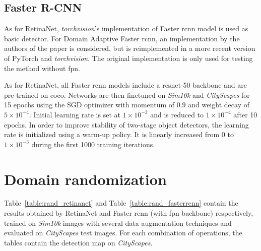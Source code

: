 \documentclass[%
    corpo=12pt,
    twoside,
    stile=classica,   
    tipotesi=magistrale,
    evenboxes,
    english,
	numerazioneromana,
]{toptesi}
\begin{document}
\subsection{Faster R-CNN}
As for RetinaNet, \textit{torchvision}'s implementation of Faster \gls{rcnn} model is used as basic detector\cite{torchvision_fasterrcnn}. For Domain Adaptive Faster \gls{rcnn}, an implementation by the authors of the paper\cite{chen2018domain} is considered\cite{dafasterrcnn_github}, but is reimplemented in a more recent version of PyTorch and \textit{torchvision}. The original implementation is only used for testing the method without \gls{fpn}.

\bigskip
As for RetinaNet, all Faster \gls{rcnn} models include a \gls{resnet}-50 backbone and are pre-trained on \gls{coco}. Networks are then finetuned on \textit{Sim10k} and \textit{CityScapes} for 15 epochs using the SGD optimizer with momentum of $0.9$ and weight decay of $5\times 10^{-4}$. Initial learning rate is set at $1\times 10^{-3}$ and is reduced to $1\times 10^{-4}$ after 10 epochs.  In order to improve stability of two-stage object detectors, the learning rate is initialized using a warm-up policy. It is linearly increased from 0 to $1 \times 10^{-3}$ during the first 1000 training iterations.

\section{Domain randomization}
Table~\ref{table:rand_retinanet} and Table~\ref{table:rand_fasterrcnn} contain the results obtained by RetinaNet and Faster \gls{rcnn} (with \gls{fpn} backbone) respectively, trained on \textit{Sim10k} images with several data augmentation techniques and evaluated on \textit{CityScapes} test images. For each combination of operations, the tables contain the detection \gls{map} on \textit{CityScapes}.
\end{document}
